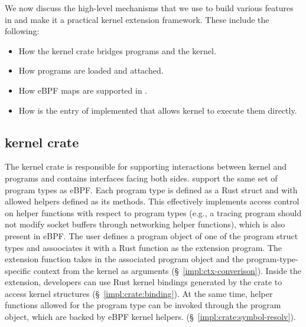 We now discuss the high-level mechanisms that we use to build various features in
    \projname{} and make it a practical kernel extension framework.
These include the following:
\begin{itemize}
    \item How the \projname{} kernel crate bridges programs and the kernel.
    \item How \projname{} programs are loaded and attached.
    \item How eBPF maps are supported in \projname{}.
    \item How is the entry of \projname{} implemented that allows kernel to
        execute them directly.
\end{itemize}

\subsection{\projname{} kernel crate}

The \projname{} kernel crate is responsible for supporting interactions between
    kernel and \projname{} programs and contains interfaces facing both sides.
\projname{} support the same set of program types as eBPF.
Each program type is defined as a Rust struct and with allowed helpers defined
    as its methods.
This effectively implements access control on helper functions with respect to
    program types (e.g., a tracing program should not modify socket buffers
    through networking helper functions), which is also present in eBPF.
The user defines a program object of one of the program struct types and
    assoociates it with a Rust function as the extension program.
The extension function takes in the associated program object and the
    program-type-specific context from the kernel as arguments
    (\S~\ref{impl:ctx-converison}).
Inside the extension, developers can use Rust kernel bindings generated by the
    crate to access kernel structures (\S~\ref{impl:crate:binding}).
At the same time, helper functions allowed for the program type can be
    invoked through the program object, which are backed by eBPF kernel helpers.
    (\S~\ref{impl:crate:symbol-resolv}).

